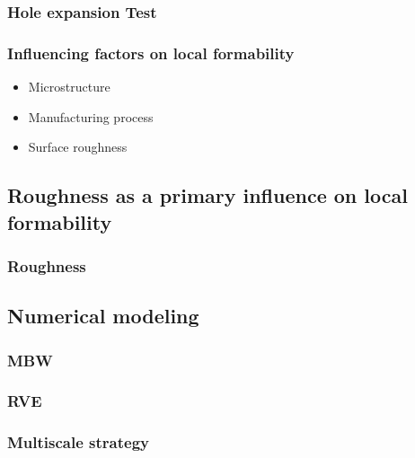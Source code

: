 \subsubsection{Hole expansion Test}
\subsubsection{Influencing factors on local formability}
\begin{itemize}
    \item{Microstructure}
    \item{Manufacturing process}
    \item{Surface roughness}
\end{itemize}


\subsection{Roughness as a primary influence on local formability}

\subsubsection{Roughness}


\subsection{Numerical modeling}
\subsubsection{MBW}
\subsubsection{RVE}
\subsubsection{Multiscale strategy}